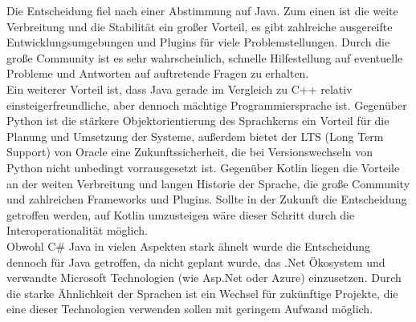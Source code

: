Die Entscheidung fiel nach einer Abstimmung auf Java. Zum einen ist die weite Verbreitung und die Stabilität ein großer Vorteil, es gibt zahlreiche ausgereifte Entwicklungsumgebungen und Plugins für viele Problemstellungen. Durch die große Community ist es sehr wahrscheinlich, schnelle Hilfestellung auf eventuelle Probleme und Antworten auf auftretende Fragen zu erhalten.\\

Ein weiterer Vorteil ist, dass Java gerade im Vergleich zu C++ relativ einsteigerfreundliche, aber dennoch mächtige Programmiersprache ist. Gegenüber Python ist die stärkere Objektorientierung des Sprachkerns ein Vorteil für die Planung und Umsetzung der Systeme, außerdem bietet der LTS (Long Term Support) von Oracle eine Zukunftssicherheit, die bei Versionswechseln von Python nicht unbedingt vorrausgesetzt ist. Gegenüber Kotlin liegen die Vorteile an der weiten Verbreitung und langen Historie der Sprache, die große Community und zahlreichen Frameworks und Plugins. Sollte in der Zukunft die Entscheidung getroffen werden, auf Kotlin umzusteigen wäre dieser Schritt durch die Interoperationalität möglich.\\

Obwohl {C\#} Java in vielen Aspekten stark ähnelt wurde die Entscheidung dennoch für Java getroffen, da nicht geplant wurde, das .Net Ökosystem und verwandte Microsoft Technologien (wie Asp.Net oder Azure) einzusetzen. Durch die starke Ähnlichkeit der Sprachen ist ein Wechsel für zukünftige Projekte, die eine dieser Technologien verwenden sollen mit geringem Aufwand möglich.\\


